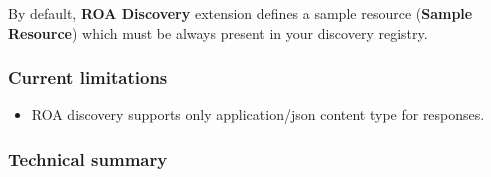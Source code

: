 \documentclass[letterpaper,10pt,english]{sphinxmanual}
\begin{document}
By default, \textbf{ROA Discovery} extension defines a sample resource (\textbf{Sample Resource}) which must be always present in your
discovery registry.


\subsubsection{Current limitations}
\label{features/components/roa_discovery/roa_discovery:current-limitations}\begin{itemize}
\item {} 
ROA discovery supports only application/json content type for responses.

\end{itemize}


\subsubsection{Technical summary}
\label{features/components/roa_discovery/roa_discovery:technical-summary}
\end{document}
